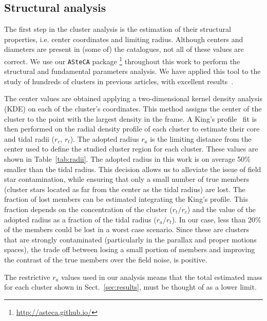 \documentclass{aa}
\begin{document}
 \subsection{Structural analysis}
  \label{sec:clust_analy}

  The first step in the cluster analysis is the estimation of their structural
  properties, i.e. center coordinates and limiting radius. Although centers and
  diameters are present in (some of) the catalogues, not all of these values are
  correct. We use our \texttt{ASteCA} package
  \citep{Perren_2015}\footnote{\url{http://asteca.github.io/}} throughout this
  work to perform the structural and fundamental parameters analysis. We have
  applied this tool to the study of hundreds of clusters in previous articles,
  with excellent results~\citep{Perren_2017,Perren_2020}.

  The center values are obtained applying a two-dimensional kernel density
  analysis (KDE) on each of the cluster's coordinates. This method assigns the
  center of the cluster to the point with the largest density in the frame. A
  King's profile~\citep{King_1962} fit is then performed on the radial density
  profile of each cluster to estimate their core and tidal radii ($r_{c}$,
  $r_{t}$). The adopted radius $r_{a}$ is the limiting distance from the
  center used to define the studied cluster region for each cluster. These
  values are shown in Table~\ref{tab:radii}. The adopted radius in this work is
  on average 50\% smaller than the tidal radius. This decision allows us to
  alleviate the issue of field star contamination, while ensuring that only a
  small number of true members (cluster stars located as far from the
  center as the tidal radius) are lost. The fraction of lost members can be
  estimated integrating the King's profile. This fraction depends on the
  concentration of the cluster ($r_{t}/r_{c}$) and the value of the adopted
  radius as a fraction of the tidal radius ($r_{a}/r_{t}$). In our case, less
  than 20\% of the members could be lost in a worst case scenario. Since these
  are clusters that are strongly contaminated (particularly in the parallax and
  proper motions spaces), the trade off between losing a small portion of
  members and improving the contrast of the true members over the field noise,
  is positive.

  The restrictive $r_{a}$ values used in our analysis means that the total
  estimated mass for each cluster shown in Sect.~\ref{sec:results}, must be
  thought of as a lower limit.\\
\end{document}

